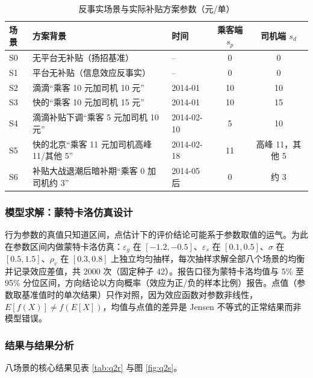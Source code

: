 \documentclass[12pt,a4paper]{ctexart}
\begin{document}
\begin{table}[H]
\centering
\caption{反事实场景与实际补贴方案参数（元/单）}
\label{tab:schemes}
\begin{tabular}{l l l c c}
\toprule
场景 & 方案背景 & 时间 & 乘客端 $s_p$ & 司机端 $s_d$ \\
\midrule
S0 & 无平台无补贴（扬招基准） & -- & 0 & 0 \\
S1 & 平台无补贴（信息效应反事实） & -- & 0 & 0 \\
S2 & 滴滴“乘客 10 元加司机 10 元” & 2014-01 & 10 & 10 \\
S3 & 快的“乘客 10 元加司机 15 元” & 2014-01 & 10 & 15 \\
S4 & 滴滴补贴下调“乘客 5 元加司机 10 元” & 2014-02-10 & 5 & 10 \\
S5 & 快的北京“乘客 11 元加司机高峰 11/其他 5” & 2014-02-18 & 11 & 高峰 11，其他 5 \\
S6 & 补贴大战退潮后暗补期“乘客 0 加司机约 3” & 2014-05 后 & 0 & 约 3 \\
\bottomrule
\end{tabular}
\end{table}

\subsubsection{模型求解：蒙特卡洛仿真设计}

行为参数的真值只知道区间，点估计下的评价结论可能系于参数取值的运气。为此在参数区间内做蒙特卡洛仿真：$\varepsilon_g$ 在 $[-1.2,-0.5]$、$\varepsilon_s$ 在 $[0.1,0.5]$、$\sigma$ 在 $[0.5,1.5]$、$\rho_v$ 在 $[0.3,0.8]$ 上独立均匀抽样，每次抽样求解全部八个场景的均衡并记录效应差值，共 2000 次（固定种子 42）。报告口径为蒙特卡洛均值与 5\% 至 95\% 分位区间，方向结论以方向概率（效应为正/负的样本比例）报告。点值（参数取基准值时的单次结果）只作对照，因为效应函数对参数非线性，$E[f(X)]\ne f(E[X])$，均值与点值的差异是 Jensen 不等式的正常结果而非模型错误。

\subsubsection{结果与结果分析}

八场景的核心结果见表 \ref{tab:q2r} 与图 \ref{fig:q2s}。
\end{document}
